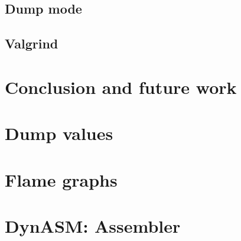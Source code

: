 \documentclass[12pt, oneside]{Thesis}
\begin{document}
    \section{Dump mode}
    \label{Sec:Dump-mode}
    

    \section{Valgrind}
    \label{Sec:Valgrind}
    

\chapter{Conclusion and future work}


\clearpage
{}
\appendix
\baselineskip=16pt

\chapter{Dump values}
\label{Apendix:dump-values}


\chapter{Flame graphs}
\label{Apendix:fl}


\chapter{DynASM: Assembler}
\label{Apendix:DynASM}



\backmatter


\label{Bibliography}

\renewcommand{\bibname}{References}


\end{document}
